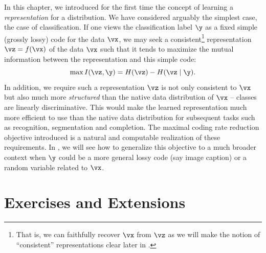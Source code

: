 \documentclass[../../book-main.tex]{subfiles}
\begin{document}
In this chapter, we introduced for the first time the concept of
learning a {\em representation} for a distribution. We have
considered arguably the simplest case, the case of classification. If
one views the classification label $\y$ as a fixed simple (grossly
lossy) code for the data $\vx$, we may seek a consistent\footnote{That
    is, we can faithfully recover $\vx$ from $\vz$ as we will make the
    notion of ``consistent'' representations clear later in
.} representation $\vz = f(\vx)$ of
the data $\vx$
such that it tends to maximize the mutual information between the
representation and this simple code:
\begin{equation}
    \max I(\vz, \y) = H(\vz) - H(\vz \mid \y).
\end{equation}
In addition, we require such a representation $\vz$ is not only
consistent to $\vx$ but also much more {\em structured} than the
native data distribution of $\vx$ -- classes are linearly
discriminative. This would make the learned representation much more
efficient to use than the native data distribution for subsequent
tasks such as recognition, segmentation and completion. The maximal
coding rate reduction objective introduced is a natural and
computable realization of these requirements. In
, we will see how to generalize this
objective to a much broader context when $\y$ could be a more general
lossy code (say image caption) or a random variable related to $\vx$.

\section{Exercises and Extensions}
\end{document}
